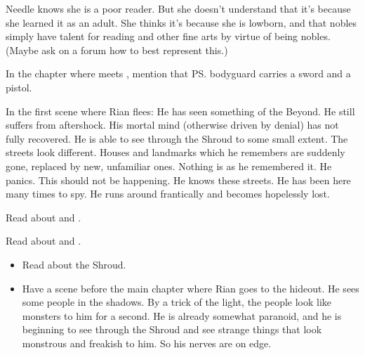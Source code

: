 \begin{changes}
    Needle knows she is a poor reader. 
    But she doesn't understand that it's because she learned it as an adult. 
    She thinks it's because she is lowborn, and that nobles simply have talent for reading and other fine arts by virtue of being nobles. 
    (Maybe ask on a forum how to best represent this.)
    
    In the chapter where \Tiroco meets \Uswa, mention that \ps{\Tiroco} bodyguard carries a sword and a pistol. 
    
    In the first scene where Rian flees: 
    He has seen something of the Beyond. 
    He still suffers from aftershock. 
    His mortal mind (otherwise driven by denial) has not fully recovered. 
    He is able to see through the Shroud to some small extent. 
    The streets look different.
    Houses and landmarks which he remembers are suddenly gone, replaced by new, unfamiliar ones. 
    Nothing is as he remembered it.
    He panics. 
    This should not be happening.
    He knows these streets. 
    He has been here many times to spy. 
    He runs around frantically and becomes hopelessly lost. 
    
  
  
  \begin{comment}
  \paragraph{The Dark Crypts of the Mind}
  \end{comment}
    Read about  and . 
    
    Read about  and . 
  
  
  \begin{comment}
  \paragraph{The Bleeding Wood}
  \end{comment}
    \begin{itemize}
      \item 
        Read about the Shroud. 
      \item 
        Have a scene before the main chapter where Rian goes to the hideout. 
        He sees some people in the shadows. 
        By a trick of the light, the people look like monsters to him for a second. 
        He is already somewhat paranoid, and he is beginning to see through the Shroud and see strange things that look monstrous and freakish to him.
        So his nerves are on edge. 
        

\end{itemize}
\end{changes}
